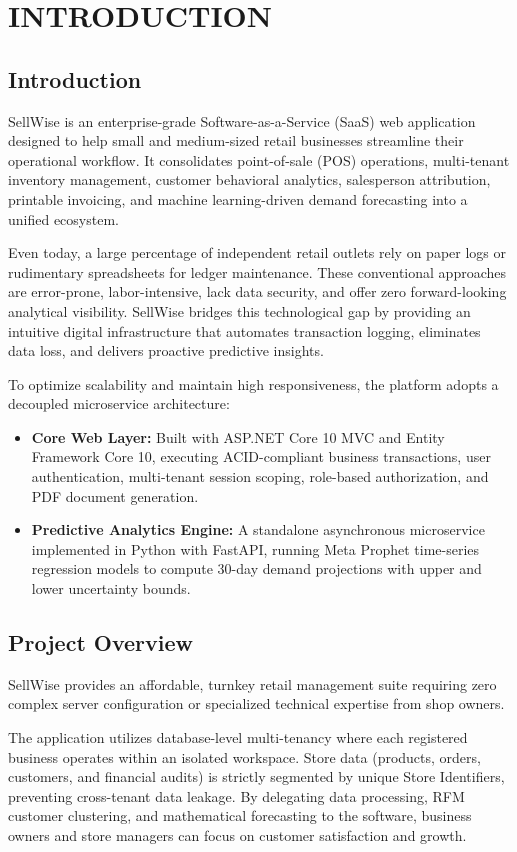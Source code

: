 \documentclass[12pt,a4paper]{report}
\begin{document}
\chapter{INTRODUCTION}
\section{Introduction}
SellWise is an enterprise-grade Software-as-a-Service (SaaS) web application designed to help small and medium-sized retail businesses streamline their operational workflow. It consolidates point-of-sale (POS) operations, multi-tenant inventory management, customer behavioral analytics, salesperson attribution, printable invoicing, and machine learning-driven demand forecasting into a unified ecosystem. 

Even today, a large percentage of independent retail outlets rely on paper logs or rudimentary spreadsheets for ledger maintenance. These conventional approaches are error-prone, labor-intensive, lack data security, and offer zero forward-looking analytical visibility. SellWise bridges this technological gap by providing an intuitive digital infrastructure that automates transaction logging, eliminates data loss, and delivers proactive predictive insights.

To optimize scalability and maintain high responsiveness, the platform adopts a decoupled microservice architecture:
\begin{itemize}
    \item \textbf{Core Web Layer:} Built with ASP.NET Core 10 MVC and Entity Framework Core 10, executing ACID-compliant business transactions, user authentication, multi-tenant session scoping, role-based authorization, and PDF document generation.
    \item \textbf{Predictive Analytics Engine:} A standalone asynchronous microservice implemented in Python with FastAPI, running Meta Prophet time-series regression models to compute 30-day demand projections with upper and lower uncertainty bounds.
\end{itemize}

\section{Project Overview}
SellWise provides an affordable, turnkey retail management suite requiring zero complex server configuration or specialized technical expertise from shop owners. 

The application utilizes database-level multi-tenancy where each registered business operates within an isolated workspace. Store data (products, orders, customers, and financial audits) is strictly segmented by unique Store Identifiers, preventing cross-tenant data leakage. By delegating data processing, RFM customer clustering, and mathematical forecasting to the software, business owners and store managers can focus on customer satisfaction and growth.
\end{document}
